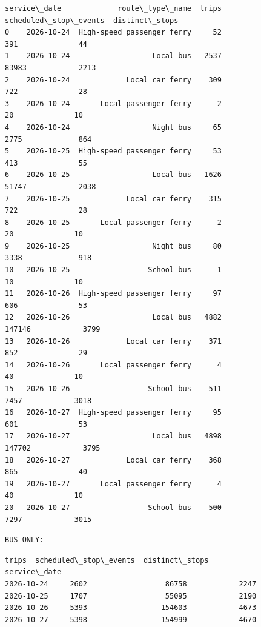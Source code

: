 \documentclass[11pt]{article}
\begin{document}
    
    \begin{Verbatim}[commandchars=\\\{\}]
   service\_date             route\_type\_name  trips  scheduled\_stop\_events  distinct\_stops
0    2026-10-24  High-speed passenger ferry     52                    391              44
1    2026-10-24                   Local bus   2537                  83983            2213
2    2026-10-24             Local car ferry    309                    722              28
3    2026-10-24       Local passenger ferry      2                     20              10
4    2026-10-24                   Night bus     65                   2775             864
5    2026-10-25  High-speed passenger ferry     53                    413              55
6    2026-10-25                   Local bus   1626                  51747            2038
7    2026-10-25             Local car ferry    315                    722              28
8    2026-10-25       Local passenger ferry      2                     20              10
9    2026-10-25                   Night bus     80                   3338             918
10   2026-10-25                  School bus      1                     10              10
11   2026-10-26  High-speed passenger ferry     97                    606              53
12   2026-10-26                   Local bus   4882                 147146            3799
13   2026-10-26             Local car ferry    371                    852              29
14   2026-10-26       Local passenger ferry      4                     40              10
15   2026-10-26                  School bus    511                   7457            3018
16   2026-10-27  High-speed passenger ferry     95                    601              53
17   2026-10-27                   Local bus   4898                 147702            3795
18   2026-10-27             Local car ferry    368                    865              40
19   2026-10-27       Local passenger ferry      4                     40              10
20   2026-10-27                  School bus    500                   7297            3015
    \end{Verbatim}

    
    \begin{Verbatim}[commandchars=\\\{\}]
BUS ONLY:
    \end{Verbatim}

    
    \begin{Verbatim}[commandchars=\\\{\}]
              trips  scheduled\_stop\_events  distinct\_stops
service\_date                                              
2026-10-24     2602                  86758            2247
2026-10-25     1707                  55095            2190
2026-10-26     5393                 154603            4673
2026-10-27     5398                 154999            4670
    \end{Verbatim}
\end{document}

